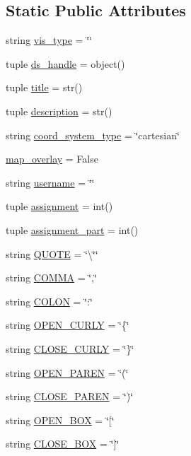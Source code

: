 \subsection*{Static Public Attributes}
\begin{DoxyCompactItemize}
\item 
string \hyperlink{class_bridges_1_1_bridges_a96486bc6649d90a5511a7a1bdd3d1701}{vis\+\_\+type} = \char`\"{}\char`\"{}
\item 
tuple \hyperlink{class_bridges_1_1_bridges_a1ffa4232527e867bb6afdf8dbcf78aa9}{ds\+\_\+handle} = object()
\item 
tuple \hyperlink{class_bridges_1_1_bridges_a2cf2b9872cf0ed990fe7162d41670d28}{title} = str()
\item 
tuple \hyperlink{class_bridges_1_1_bridges_ab7bdd8fcffa80dc8ab42aad8666e2a47}{description} = str()
\item 
string \hyperlink{class_bridges_1_1_bridges_abaac60993b60603013d663a818674d10}{coord\+\_\+system\+\_\+type} = \char`\"{}cartesian\char`\"{}
\item 
\hyperlink{class_bridges_1_1_bridges_a3db2edccff7d64118f11dbf294700ec4}{map\+\_\+overlay} = False
\item 
string \hyperlink{class_bridges_1_1_bridges_aac3c71b6c4965da2a189e1be805a6c95}{username} = \char`\"{}\char`\"{}
\item 
tuple \hyperlink{class_bridges_1_1_bridges_ab51a162b834a8c908ab1702716feb435}{assignment} = int()
\item 
tuple \hyperlink{class_bridges_1_1_bridges_ab34be7a9e7bf7910509e612b03c6752d}{assignment\+\_\+part} = int()
\item 
string \hyperlink{class_bridges_1_1_bridges_a758e6c0216d8224ee9d4b10fdf816e4b}{Q\+U\+O\+T\+E} = \char`\"{}\textbackslash{}\char`\"{}\char`\"{}
\item 
string \hyperlink{class_bridges_1_1_bridges_a9939212a309fca7a32eabf355cee4d24}{C\+O\+M\+M\+A} = \char`\"{},\char`\"{}
\item 
string \hyperlink{class_bridges_1_1_bridges_aa165458d4c403129219daac59173f7a6}{C\+O\+L\+O\+N} = \char`\"{}\+:\char`\"{}
\item 
string \hyperlink{class_bridges_1_1_bridges_a7d530ed8148bcc37fb74eb8e9ee8db5b}{O\+P\+E\+N\+\_\+\+C\+U\+R\+L\+Y} = \char`\"{}\{\char`\"{}
\item 
string \hyperlink{class_bridges_1_1_bridges_a14decfd67596e7cd17fe0daa3d8ed02b}{C\+L\+O\+S\+E\+\_\+\+C\+U\+R\+L\+Y} = \char`\"{}\}\char`\"{}
\item 
string \hyperlink{class_bridges_1_1_bridges_a7cd7a24301f9851a88429e519bac113d}{O\+P\+E\+N\+\_\+\+P\+A\+R\+E\+N} = \char`\"{}(\char`\"{}
\item 
string \hyperlink{class_bridges_1_1_bridges_aa7ad49c9768f1c577819764180c77038}{C\+L\+O\+S\+E\+\_\+\+P\+A\+R\+E\+N} = \char`\"{})\char`\"{}
\item 
string \hyperlink{class_bridges_1_1_bridges_a11f17a6c2a6fc26070b4459d7e2e61b8}{O\+P\+E\+N\+\_\+\+B\+O\+X} = \char`\"{}\mbox{[}\char`\"{}
\item 
string \hyperlink{class_bridges_1_1_bridges_aebc01e1d0cf167e4ede20eb32351ff75}{C\+L\+O\+S\+E\+\_\+\+B\+O\+X} = \char`\"{}\mbox{]}\char`\"{}
\end{DoxyCompactItemize}


